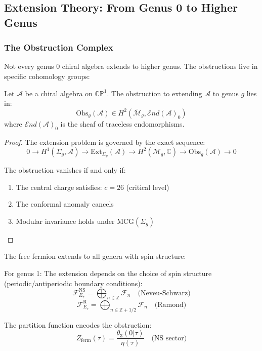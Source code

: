 \subsection{Extension Theory: From Genus 0 to Higher Genus}

\subsubsection{The Obstruction Complex}

Not every genus 0 chiral algebra extends to higher genus. The obstructions live in specific cohomology groups:

\begin{theorem}
Let $\mathcal{A}$ be a chiral algebra on $\mathbb{CP}^1$. The obstruction to extending $\mathcal{A}$ to genus $g$ lies in:
\[
\text{Obs}_g(\mathcal{A}) \in H^2(\overline{\mathcal{M}}_g, \mathcal{E}nd(\mathcal{A})_0)
\]
where $\mathcal{E}nd(\mathcal{A})_0$ is the sheaf of traceless endomorphisms.
\end{theorem}

\begin{proof}
The extension problem is governed by the exact sequence:
\[
0 \to H^1(\Sigma_g, \mathcal{A}) \to \text{Ext}_{\Sigma_g}(\mathcal{A}) \to H^2(\mathcal{M}_g, \mathbb{C}) \to \text{Obs}_g(\mathcal{A}) \to 0
\]

The obstruction vanishes if and only if:
\begin{enumerate}
\item The central charge satisfies: $c = 26$ (critical level)
\item The conformal anomaly cancels
\item Modular invariance holds under $\text{MCG}(\Sigma_g)$
\end{enumerate}
\end{proof}

\begin{example}
The free fermion extends to all genera with spin structure:

For genus 1: The extension depends on the choice of spin structure (periodic/antiperiodic boundary conditions):
\[
\mathcal{F}_{E_\tau}^{\text{NS}} = \bigoplus_{n \in \mathbb{Z}} \mathcal{F}_n \quad \text{(Neveu-Schwarz)}
\]
\[
\mathcal{F}_{E_\tau}^{\text{R}} = \bigoplus_{n \in \mathbb{Z} + 1/2} \mathcal{F}_n \quad \text{(Ramond)}
\]

The partition function encodes the obstruction:
\[
Z_{\text{ferm}}(\tau) = \frac{\theta_3(0|\tau)}{\eta(\tau)} \quad \text{(NS sector)}
\]
\end{example}

